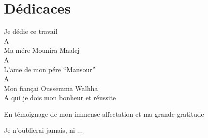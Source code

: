 \section*{Dédicaces}

Je dédie ce travail \\
A\\
Ma mére Mounira Maalej \\
A\\
L'ame de mon pére ``Mansour''\\
A\\
Mon fiançai Oussemma Walhha \\
A qui je dois mon bonheur et réussite 

En témoignage de mon immense affectation et ma grande gratitude 

Je n'oublierai jamais, ni ...
